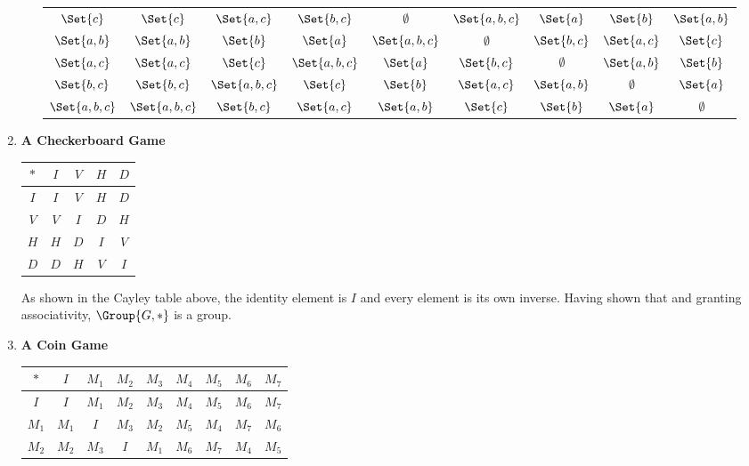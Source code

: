 \begin{enumerate}[label={\Alph*.},font={\bfseries}]
\begin{enumerate}[label={\arabic*},font={\bfseries}]
\begin{center}
\begin{tabular}{ c | c c c c c c c c}
        $\Set{c}$ & $\Set{c}$ & $\Set{a,c}$ & $\Set{b,c}$ & $\emptyset$ & $\Set{a,b,c}$ & $\Set{a}$ & $\Set{b}$ & $\Set{a,b}$ \\
        $\Set{a,b}$ & $\Set{a,b}$ & $\Set{b}$ & $\Set{a}$ & $\Set{a,b,c}$ & $\emptyset$ & $\Set{b,c}$ & $\Set{a,c}$ & $\Set{c}$ \\
        $\Set{a,c}$ & $\Set{a,c}$ & $\Set{c}$ & $\Set{a,b,c}$ & $\Set{a}$ & $\Set{b,c}$ & $\emptyset$ & $\Set{a,b}$ & $\Set{b}$ \\
        $\Set{b,c}$ & $\Set{b,c}$ & $\Set{a,b,c}$ & $\Set{c}$ & $\Set{b}$ & $\Set{a,c}$ & $\Set{a,b}$ & $\emptyset$ & $\Set{a}$ \\
        $\Set{a,b,c}$ & $\Set{a,b,c}$ & $\Set{b,c}$ & $\Set{a,c}$ & $\Set{a,b}$ & $\Set{c}$ & $\Set{b}$ & $\Set{a}$ & $\emptyset$
      \end{tabular}
    \end{center}
  \end{enumerate}
\item {\bf A Checkerboard Game}
  \begin{center}
    \begin{tabular}{ c | c c c c }
      $*$ & $I$ & $V$ & $H$ & $D$ \\
      \hline
      $I$ & $I$ & $V$ & $H$ & $D$ \\
      $V$ & $V$ & $I$ & $D$ & $H$ \\
      $H$ & $H$ & $D$ & $I$ & $V$ \\
      $D$ & $D$ & $H$ & $V$ & $I$
    \end{tabular}
  \end{center}
  As shown in the \gls{Cayley table} above, the identity element is $I$ and
  every element is its own inverse. Having shown that and granting
  associativity, $\Group{G, *}$ is a group.
\item {\bf A Coin Game}
  \begin{center}
    \begin{tabular}{ c | c c c c c c c c }
      $*$ & $I$ & $M_1$ & $M_2$ & $M_3$ & $M_4$ & $M_5$ & $M_6$ & $M_7$ \\
      \hline
      $I$ & $I$ & $M_1$ & $M_2$ & $M_3$ & $M_4$ & $M_5$ & $M_6$ & $M_7$ \\
      $M_1$ & $M_1$ & $I$ & $M_3$ & $M_2$ & $M_5$ & $M_4$ & $M_7$ & $M_6$ \\
      $M_2$ & $M_2$ & $M_3$ & $I$ & $M_1$ & $M_6$ & $M_7$ & $M_4$ & $M_5$ \\

\end{tabular}
\end{center}
\end{enumerate}
